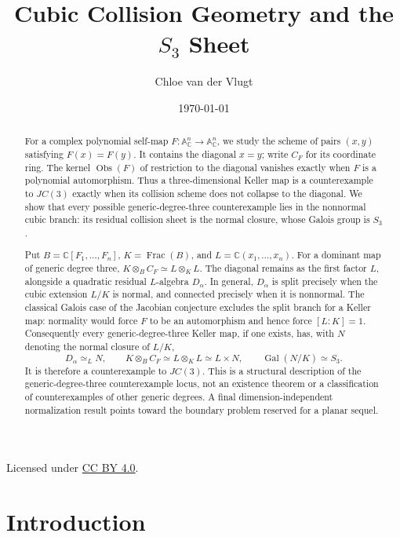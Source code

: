 \documentclass[11pt]{article}
\title{Cubic Collision Geometry and the \(S_3\) Sheet}
\author{Chloe van der Vlugt}
\date{\today}
\theoremstyle{remark}
\theoremstyle{definition}
\DeclareMathOperator{\Frac}{Frac}
\DeclareMathOperator{\Gal}{Gal}
\newcommand{\A}{\mathbb A}
\newcommand{\C}{\mathbb C}
\newcommand{\Obs}{\operatorname{Obs}}
\begin{document}
\maketitle

\begin{abstract}
For a complex polynomial self-map
\(F\colon\A^n_{\C}\to\A^n_{\C}\), we study the scheme of pairs
\((x,y)\) satisfying \(F(x)=F(y)\).  It contains the diagonal \(x=y\);
write \(C_F\) for its coordinate ring.  The
kernel \(\Obs(F)\) of restriction to the diagonal vanishes exactly when
\(F\) is a polynomial automorphism.
Thus a three-dimensional Keller map is a counterexample to \(JC(3)\)
exactly when its collision scheme does not collapse to the diagonal.  We
show that every possible generic-degree-three counterexample lies in
the nonnormal cubic branch: its residual collision sheet is the normal
closure, whose Galois group is \(S_3\).

Put
\(B=\C[F_1,\dots,F_n]\), \(K=\Frac(B)\), and
\(L=\C(x_1,\dots,x_n)\).  For a dominant map of generic degree three,
\(K\otimes_BC_F\simeq L\otimes_KL\).  The diagonal remains as
the first factor \(L\), alongside a quadratic residual \(L\)-algebra
\(D_\alpha\).  In general, \(D_\alpha\) is split precisely when the
cubic extension \(L/K\) is normal, and connected precisely when it is
nonnormal.  The classical Galois case of the Jacobian conjecture excludes
the split branch for a Keller map: normality would force \(F\) to be an
automorphism and hence force \([L:K]=1\).  Consequently every
generic-degree-three Keller map, if one exists, has, with \(N\) denoting
the normal closure of \(L/K\),
\[
  D_\alpha\simeq_L N,\qquad
  K\otimes_BC_F\simeq L\otimes_KL\simeq L\times N,
  \qquad
  \Gal(N/K)\simeq S_3.
\]
It is therefore a counterexample to \(JC(3)\).  This is a structural
description of the generic-degree-three counterexample locus, not an
existence theorem or a classification of counterexamples of other generic
degrees.  A final dimension-independent normalization result points toward
the boundary problem reserved for a planar sequel.
\end{abstract}

\begin{center}
  \small Licensed under
  \href{https://creativecommons.org/licenses/by/4.0/}
    {CC BY 4.0}.
\end{center}

\tableofcontents

\section{Introduction}
\label{sec:introduction}
\end{document}
